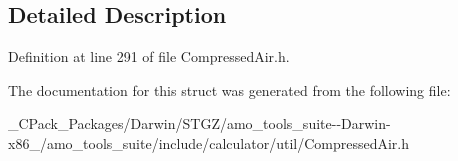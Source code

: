 \subsection{Detailed Description}


Definition at line 291 of file Compressed\+Air.\+h.



The documentation for this struct was generated from the following file\+:\begin{DoxyCompactItemize}
\item 
\+\_\+\+C\+Pack\+\_\+\+Packages/\+Darwin/\+S\+T\+G\+Z/amo\+\_\+tools\+\_\+suite-\/-\/\+Darwin-\/x86\+\_/amo\+\_\+tools\+\_\+suite/include/calculator/util/Compressed\+Air.\+h\end{DoxyCompactItemize}
